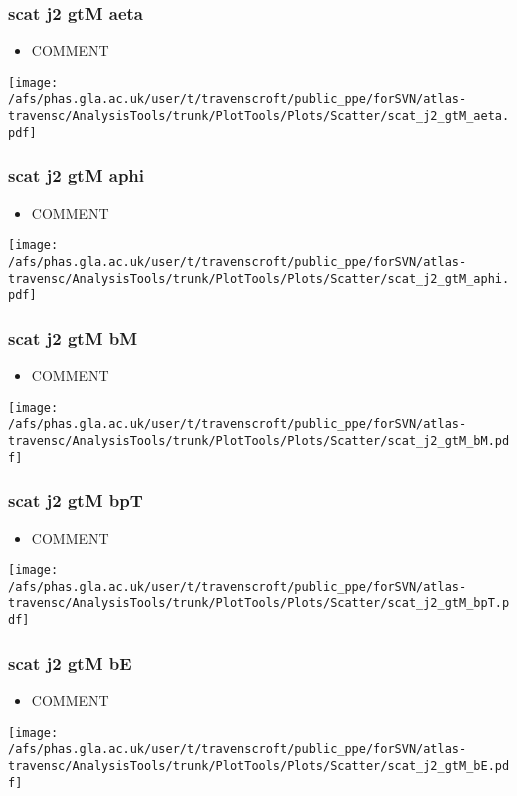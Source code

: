 \documentclass{beamer}
\begin{document}
\begin{frame}
\frametitle{scat j2 gtM aeta}
\begin{itemize}
\item COMMENT
\end{itemize}
\begin{center}
\texttt{[image: /afs/phas.gla.ac.uk/user/t/travenscroft/public\_ppe/forSVN/atlas-travensc/AnalysisTools/trunk/PlotTools/Plots/Scatter/scat\_j2\_gtM\_aeta.pdf]}
\end{center}
\end{frame}

\begin{frame}
\frametitle{scat j2 gtM aphi}
\begin{itemize}
\item COMMENT
\end{itemize}
\begin{center}
\texttt{[image: /afs/phas.gla.ac.uk/user/t/travenscroft/public\_ppe/forSVN/atlas-travensc/AnalysisTools/trunk/PlotTools/Plots/Scatter/scat\_j2\_gtM\_aphi.pdf]}
\end{center}
\end{frame}

\begin{frame}
\frametitle{scat j2 gtM bM}
\begin{itemize}
\item COMMENT
\end{itemize}
\begin{center}
\texttt{[image: /afs/phas.gla.ac.uk/user/t/travenscroft/public\_ppe/forSVN/atlas-travensc/AnalysisTools/trunk/PlotTools/Plots/Scatter/scat\_j2\_gtM\_bM.pdf]}
\end{center}
\end{frame}

\begin{frame}
\frametitle{scat j2 gtM bpT}
\begin{itemize}
\item COMMENT
\end{itemize}
\begin{center}
\texttt{[image: /afs/phas.gla.ac.uk/user/t/travenscroft/public\_ppe/forSVN/atlas-travensc/AnalysisTools/trunk/PlotTools/Plots/Scatter/scat\_j2\_gtM\_bpT.pdf]}
\end{center}
\end{frame}

\begin{frame}
\frametitle{scat j2 gtM bE}
\begin{itemize}
\item COMMENT
\end{itemize}
\begin{center}
\texttt{[image: /afs/phas.gla.ac.uk/user/t/travenscroft/public\_ppe/forSVN/atlas-travensc/AnalysisTools/trunk/PlotTools/Plots/Scatter/scat\_j2\_gtM\_bE.pdf]}
\end{center}
\end{frame}
\end{document}
